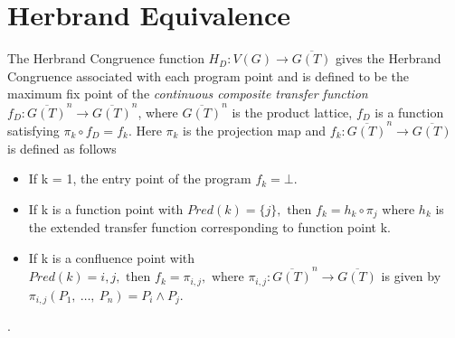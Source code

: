 \section{Herbrand Equivalence}
The Herbrand Congruence function $H_D : V(G) \to \overline{G(T)}$ 
gives the Herbrand Congruence associated with each program point and 
is defined to be the maximum fix point of the \textit{continuous
composite transfer function} 
$f_D : \overline{G(T)}^n \to \overline{G(T)}^n$, where 
$\overline{G(T)}^n$ is the product lattice, $f_D$ is a function satisfying $\pi_k \circ f_D = f_k$. Here $\pi_k$ is the projection map
and $f_k : \overline{G(T)}^n \to \overline{G(T)}$ is defined as follows 
\begin{itemize}
    \item   If k = 1, the entry point of the program $f_k = \bot$.
    \item   If k is a function point with $Pred(k) = \{j\}, \text{ then } f_k = h_k \circ \pi_j$ where 
    $h_k$ is the extended transfer function corresponding to function point k.
    \item   If k is a confluence point with $Pred(k) = {i, j}, \text{ then } f_k = \pi_{i, j}, \text{ where }
    \pi_{i, j}:\overline{G(T)}^n \to \overline{G(T)}$ is given by $\pi_{i,j}(P_1,\ \dots,\ P_n) = P_i \land P_j$.
\end{itemize}.